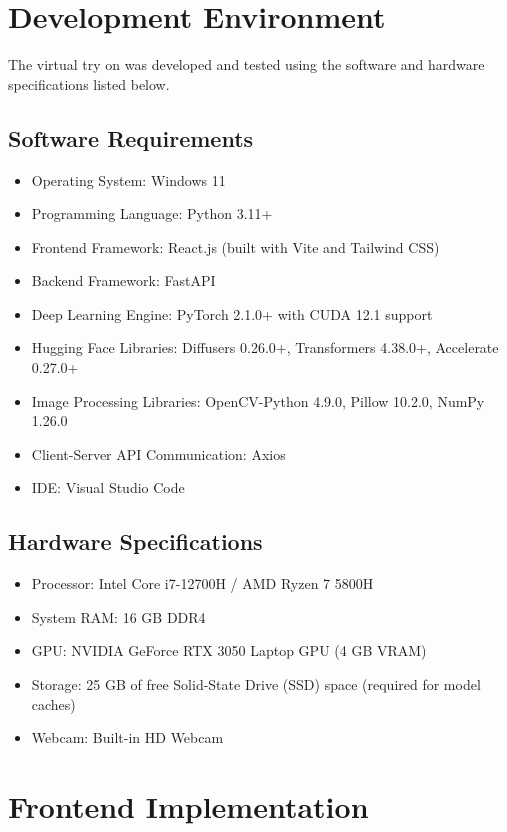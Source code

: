 \documentclass[12pt, a4paper]{report}
\begin{document}
\section{Development Environment}

The virtual try on was developed and tested using the software and hardware specifications listed below.

\subsection{Software Requirements}

\begin{itemize}
\item Operating System: Windows 11
\item Programming Language: Python 3.11+
\item Frontend Framework: React.js (built with Vite and Tailwind CSS)
\item Backend Framework: FastAPI
\item Deep Learning Engine: PyTorch 2.1.0+ with CUDA 12.1 support
\item Hugging Face Libraries: Diffusers 0.26.0+, Transformers 4.38.0+, Accelerate 0.27.0+
\item Image Processing Libraries: OpenCV-Python 4.9.0, Pillow 10.2.0, NumPy 1.26.0
\item Client-Server API Communication: Axios
\item IDE: Visual Studio Code
\end{itemize}

\subsection{Hardware Specifications}

\begin{itemize}
\item Processor: Intel Core i7-12700H / AMD Ryzen 7 5800H
\item System RAM: 16 GB DDR4
\item GPU: NVIDIA GeForce RTX 3050 Laptop GPU (4 GB VRAM)
\item Storage: 25 GB of free Solid-State Drive (SSD) space (required for model caches)
\item Webcam: Built-in HD Webcam
\end{itemize}

\section{Frontend Implementation}
\end{document}
